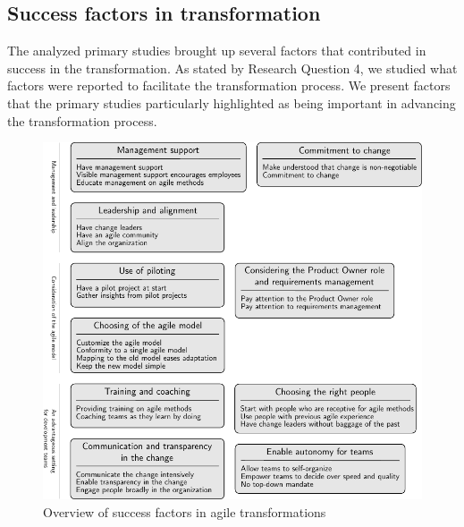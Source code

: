 \documentclass[preprint,authoryear,12pt]{elsarticle}
\begin{document}



\clearpage

\subsection{Success factors in transformation}

The analyzed primary studies brought up several factors that contributed in
success in the transformation. As stated by Research Question 4, we studied what
factors were reported to facilitate the transformation process. We present
factors that the primary studies particularly highlighted as being important in
advancing the transformation process.

\begin{figure}[!b]
  \begin{center}
    \includegraphics[width=1\textwidth]{graphics/success_summary.pdf}
    \caption{Overview of success factors in agile transformations}
    \label{fig:success_summary}
  \end{center}
\end{figure}
\end{document}
